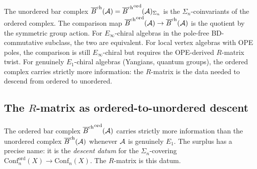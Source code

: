 \begin{remark}
The unordered bar complex
$\overline{B}^{\mathrm{ch}}(\mathcal{A})={\overline{B}^{\mathrm{ch}}}^{\mathrm{ord}}(\mathcal{A})_{\Sigma_n}$
is the $\Sigma_n$-coinvariants of the ordered complex.
The comparison map
${\overline{B}^{\mathrm{ch}}}^{\mathrm{ord}}(\mathcal{A})\to\overline{B}^{\mathrm{ch}}(\mathcal{A})$
is the quotient by the symmetric group action. For
$E_\infty$-chiral algebras in the pole-free
BD-commutative subclass, the two are equivalent. For local
vertex algebras with OPE poles, the comparison is still
$E_\infty$-chiral but requires the OPE-derived
$R$-matrix twist. For genuinely $E_1$-chiral
algebras (Yangians, quantum groups), the ordered complex
carries strictly more information: the $R$-matrix is the
data needed to descend from ordered to unordered.
\end{remark}

\subsection{The $R$-matrix as ordered-to-unordered descent}

The ordered bar complex ${\overline{B}^{\mathrm{ch}}}^{\mathrm{ord}}(\mathcal{A})$ carries
strictly more information than the unordered complex $\overline{B}^{\mathrm{ch}}(\mathcal{A})$
whenever $\mathcal{A}$ is genuinely $E_1$. The surplus has a precise name:
it is the \emph{descent datum} for the $\Sigma_n$-covering
$\mathrm{Conf}_n^{\mathrm{ord}}(X)\to\mathrm{Conf}_n(X)$.
The $R$-matrix is this datum.

